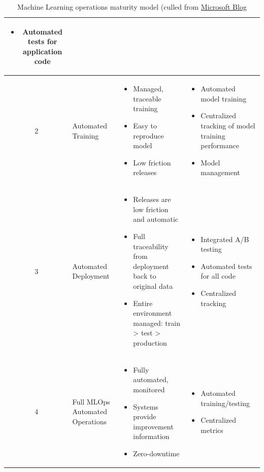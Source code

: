 \documentclass[letterpaper,12pt,notitlepage,twoside]{report}
\begin{document}
\begin{table}[H]
{\begin{tabular}{cp{2.5cm}p{7.0cm}p{7.0cm}}
\begin{itemize}[noitemsep, topsep=0pt]
    \item Automated tests for application code
\end{itemize} \\ \hline
2     & Automated Training              & \begin{itemize}[noitemsep, topsep=0pt]
   \item Managed, traceable training
    \item Easy to reproduce model
    \item Low friction releases
\end{itemize}                      & \begin{itemize}[noitemsep, topsep=0pt]
    \item Automated model training
    \item Centralized tracking of model training performance
    \item Model management
\end{itemize} \\ \hline
3     & Automated Deployment     & \begin{itemize}[noitemsep, topsep=0pt]
    \item Releases are low friction and automatic
    \item Full traceability from deployment back to original data
    \item Entire environment managed: train > test > production
\end{itemize}                            & \begin{itemize}[noitemsep, topsep=0pt]
   \item Integrated A/B testing
    \item Automated tests for all code
    \item Centralized tracking
\end{itemize} \\ \hline
4     & Full MLOps Automated Operations & \begin{itemize}[noitemsep, topsep=0pt]
    \item Fully automated, monitored
    \item Systems provide improvement information
    \item Zero-downtime
\end{itemize} & \begin{itemize}[noitemsep, topsep=0pt]
    \item Automated training/testing
    \item Centralized metrics
\end{itemize}                                                              \\ \hline \hline
\end{tabular}%
}
\caption{Machine Learning operations maturity model (culled from \href{https://learn.microsoft.com/en-us/azure/architecture/ai-ml/guide/mlops-maturity-model}{Microsoft Blog}}
\label{tab:my-table}
\end{table}
\end{document}
